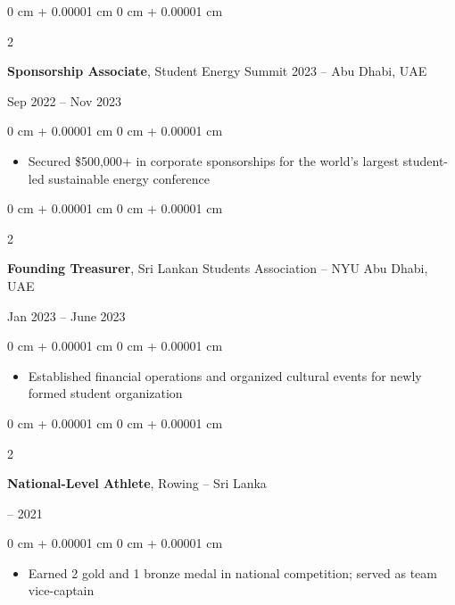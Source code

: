 \documentclass[10 pt,letterpaper]{article}
\newenvironment{highlights}{
    \begin{itemize}[
        topsep=0.10 cm,
        parsep=0.10 cm,
        partopsep=0pt,
        itemsep=0pt,
        leftmargin=0 cm + 10pt
    ]
}{
    \end{itemize}
} %
\newenvironment{onecolentry}{
    \begin{adjustwidth}{
        0 cm + 0.00001 cm
    }{
        0 cm + 0.00001 cm
    }
}{
    \end{adjustwidth}
} %
\newenvironment{twocolentry}[2][]{
    \onecolentry
    \def\secondColumn{#2}
    \setcolumnwidth{\fill, 4.5 cm}
    \begin{paracol}{2}
}{
    \switchcolumn \raggedleft \secondColumn
    \end{paracol}
    \endonecolentry
} %
\begin{document}
        \begin{twocolentry}{
            Sep 2022 – Nov 2023
        }
            \textbf{Sponsorship Associate}, Student Energy Summit 2023 -- Abu Dhabi, UAE
        \end{twocolentry}
        \vspace{0.1 cm}
        \begin{onecolentry}
            \begin{highlights}
                \item Secured \$500,000+ in corporate sponsorships for the world's largest student-led sustainable energy conference
            \end{highlights}
        \end{onecolentry}

        \vspace{0.1 cm}

        \begin{twocolentry}{
            Jan 2023 – June 2023
        }
            \textbf{Founding Treasurer}, Sri Lankan Students Association -- 
            NYU Abu Dhabi, UAE
        \end{twocolentry}
        \vspace{0.1 cm}
        \begin{onecolentry}
            \begin{highlights}
                \item Established financial operations and organized cultural events for newly formed student organization
            \end{highlights}
        \end{onecolentry}


        \vspace{0.1 cm}
        
        \begin{twocolentry}{
            2015 – 2021
        }
            \textbf{National-Level Athlete}, Rowing -- Sri Lanka
        \end{twocolentry}
        \vspace{0.1 cm}
        \begin{onecolentry}
            \begin{highlights}
                \item Earned 2 gold and 1 bronze medal in national competition; served as team vice-captain
            \end{highlights}
        \end{onecolentry}
    
\end{document}
